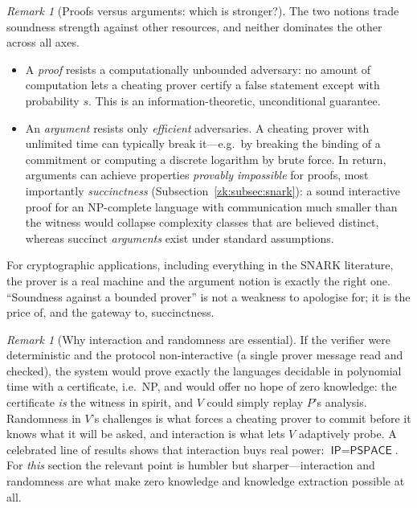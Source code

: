 \documentclass[11pt,a4paper]{article}
\theoremstyle{definition}
\theoremstyle{remark}
\newtheorem{remark}[theorem]{Remark}
\begin{document}
\begin{remark}[Proofs versus arguments: which is stronger?]\label{zk:rem:proofvsarg}
The two notions trade soundness strength against other resources, and neither dominates the other across all axes.
\begin{itemize}
  \item A \emph{proof} resists a computationally unbounded adversary: no amount of computation lets a cheating prover certify a false statement except with probability \(s\). This is an information-theoretic, unconditional guarantee.
  \item An \emph{argument} resists only \emph{efficient} adversaries. A cheating prover with unlimited time can typically break it---e.g.\ by breaking the binding of a commitment or computing a discrete logarithm by brute force. In return, arguments can achieve properties \emph{provably impossible} for proofs, most importantly \emph{succinctness} (Subsection~\ref{zk:subsec:snark}): a sound interactive proof for an \textsf{NP}-complete language with communication much smaller than the witness would collapse complexity classes that are believed distinct, whereas succinct \emph{arguments} exist under standard assumptions.
\end{itemize}
For cryptographic applications, including everything in the SNARK literature, the prover is a real machine and the argument notion is exactly the right one. ``Soundness against a bounded prover'' is not a weakness to apologise for; it is the price of, and the gateway to, succinctness.
\end{remark}

\begin{remark}[Why interaction and randomness are essential]\label{zk:rem:interaction}
If the verifier were deterministic and the protocol non-interactive (a single prover message read and checked), the system would prove exactly the languages decidable in polynomial time with a certificate, i.e.\ \textsf{NP}, and would offer no hope of zero knowledge: the certificate \emph{is} the witness in spirit, and \(V\) could simply replay \(P\)'s analysis. Randomness in \(V\)'s challenges is what forces a cheating prover to commit before it knows what it will be asked, and interaction is what lets \(V\) adaptively probe. A celebrated line of results shows that interaction buys real power: \(\textsf{IP} = \textsf{PSPACE}\). For \emph{this} section the relevant point is humbler but sharper---interaction and randomness are what make zero knowledge and knowledge extraction possible at all.
\end{remark}
\end{document}
